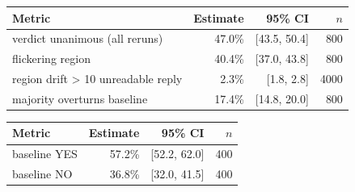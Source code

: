 \begin{tabular}{lrrr}
\toprule
Metric & Estimate & 95\% CI & $n$ \\
\midrule
verdict unanimous (all reruns) & 47.0\% & [43.5, 50.4] & 800 \\
flickering region & 40.4\% & [37.0, 43.8] & 800 \\
region drift > 10%
unreadable reply & 2.3\% & [1.8, 2.8] & 4000 \\
majority overturns baseline & 17.4\% & [14.8, 20.0] & 800 \\
\bottomrule
\end{tabular}

\begin{tabular}{lrrr}
\toprule
Metric & Estimate & 95\% CI & $n$ \\
\midrule
baseline YES & 57.2\% & [52.2, 62.0] & 400 \\
baseline NO & 36.8\% & [32.0, 41.5] & 400 \\
\bottomrule
\end{tabular}


